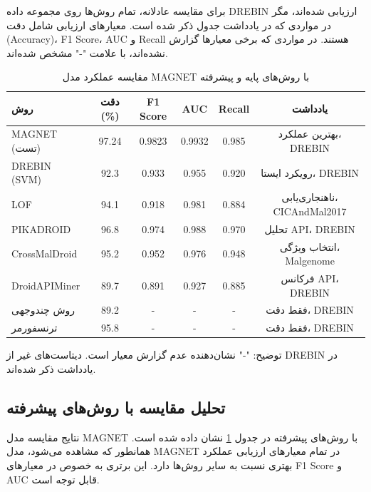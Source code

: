 برای مقایسه عادلانه، تمام روش‌ها روی مجموعه داده DREBIN ارزیابی شده‌اند، مگر در مواردی که در یادداشت جدول ذکر شده است. معیارهای ارزیابی شامل دقت (Accuracy)، F1 Score، AUC و Recall هستند. در مواردی که برخی معیارها گزارش نشده‌اند، با علامت "-" مشخص شده‌اند.

\begin{table}[h!]
    \centering
    \caption{مقایسه عملکرد مدل MAGNET با روش‌های پایه و پیشرفته}
    \label{tab:comparison_with_literature}
    \begin{tabular}{|l|c|c|c|c|c|}
        \hline
        \textbf{روش} & \textbf{دقت (\%)} & \textbf{F1 Score} & \textbf{AUC} & \textbf{Recall} & \textbf{یادداشت} \\
        \hline
        MAGNET (تست) & 97.24 & 0.9823 & 0.9932 & 0.985 & بهترین عملکرد، DREBIN \\
        \hline
        DREBIN (SVM) & 92.3 & 0.933 & 0.955 & 0.920 & رویکرد ایستا، DREBIN \\
        \hline
        LOF & 94.1 & 0.918 & 0.981 & 0.884 & ناهنجاری‌یابی، CICAndMal2017 \\
        \hline
        PIKADROID & 96.8 & 0.974 & 0.988 & 0.970 & تحلیل API، DREBIN \\
        \hline
        CrossMalDroid & 95.2 & 0.952 & 0.976 & 0.948 & انتخاب ویژگی، Malgenome \\
        \hline
        DroidAPIMiner & 89.7 & 0.891 & 0.927 & 0.885 & فرکانس API، DREBIN \\
        \hline
        روش چندوجهی & 89.2 & - & - & - & فقط دقت، DREBIN \\
        \hline
        ترنسفورمر & 95.8 & - & - & - & فقط دقت، DREBIN \\
        \hline
    \end{tabular}
    \begin{tablenotes}
        \item \small{توضیح: "-" نشان‌دهنده عدم گزارش معیار است. دیتاست‌های غیر از DREBIN در یادداشت ذکر شده‌اند.}
    \end{tablenotes}
\end{table}

\subsection{تحلیل مقایسه با روش‌های پیشرفته}
نتایج مقایسه مدل MAGNET با روش‌های پیشرفته در جدول \ref{tab:comparison_with_literature} نشان داده شده است. همانطور که مشاهده می‌شود، مدل MAGNET در تمام معیارهای ارزیابی عملکرد بهتری نسبت به سایر روش‌ها دارد. این برتری به خصوص در معیارهای F1 Score و AUC قابل توجه است.


